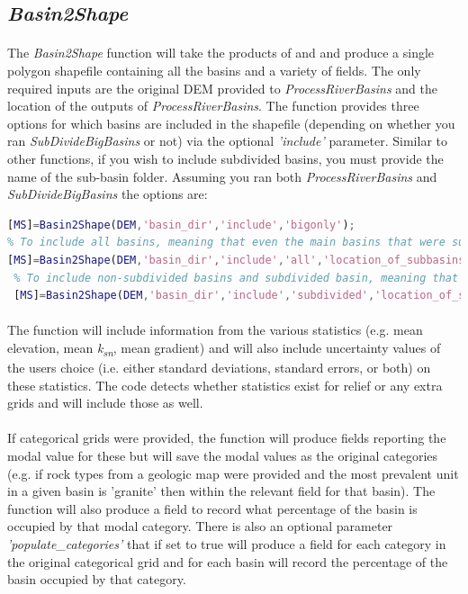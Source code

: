 \subsection{\textit{Basin2Shape}} \label{sec:B2S}
\paragraph{}The \textit{Basin2Shape} function will take the products of  and  and produce a single polygon shapefile containing all the basins and a variety of fields. The only required inputs are the original DEM provided to \textit{ProcessRiverBasins} and the location of the outputs of \textit{ProcessRiverBasins}. The function provides three options for which basins are included in the shapefile (depending on whether you ran \textit{SubDivideBigBasins} or not) via the optional \textit{'include'} parameter. Similar to other functions, if you wish to include subdivided basins, you must provide the name of the sub-basin folder. Assuming you ran both \textit{ProcessRiverBasins} and \textit{SubDivideBigBasins} the options are:

\begin{lstlisting}[language=Matlab]
% To include only the original products of ProcessRiverBasins
[MS]=Basin2Shape(DEM,'basin_dir','include','bigonly');
% To include all basins, meaning that even the main basins that were subdivided will be inlcuded
[MS]=Basin2Shape(DEM,'basin_dir','include','all','location_of_subbasins','my_sub_basins');
 % To include non-subdivided basins and subdivided basin, meaning that main basins that were subdivided will  NOT be included
 [MS]=Basin2Shape(DEM,'basin_dir','include','subdivided','location_of_subbasins','my_sub_basins');
\end{lstlisting}

\paragraph{}The function will include information from the various statistics (e.g. mean elevation, mean \textit{k\textsubscript{sn}}, mean gradient) and will also include uncertainty values of the users choice (i.e. either standard deviations, standard errors, or both) on these statistics. The code detects whether statistics exist for relief or any extra grids and will include those as well. 

\paragraph{}If categorical grids were provided, the function will produce fields reporting the modal value for these but will save the modal values as the original categories (e.g. if rock types from a geologic map were provided and the most prevalent unit in a given basin is 'granite' then within the relevant field for that basin). The function will also produce a field to record what percentage of the basin is occupied by that modal category. There is also an optional parameter \textit{'populate\_categories'} that if set to true will produce a field for each category in the original categorical grid and for each basin will record the percentage of the basin occupied by that category.

